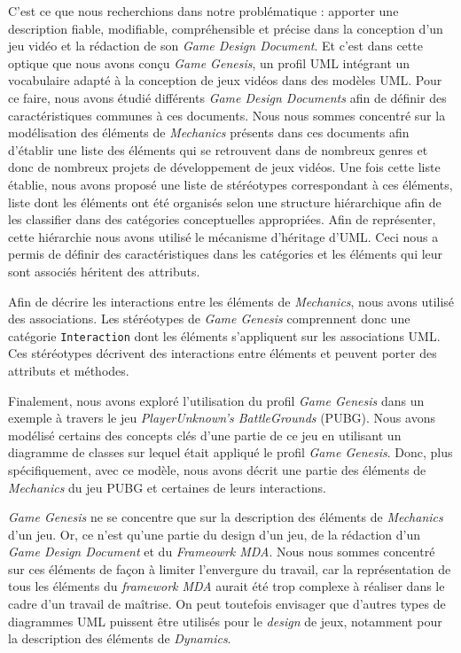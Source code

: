\begin{conclusion}



C'est ce que nous recherchions dans notre problématique : apporter une description fiable, modifiable, compréhensible et précise dans la conception d'un jeu vidéo et la rédaction de son \emph{Game Design Document}.
%
Et c'est dans cette optique que nous avons conçu \emph{Game Genesis}, un profil UML intégrant un vocabulaire adapté à la conception de jeux vidéos dans des modèles UML.
%
Pour ce faire, 
nous avons étudié différents \emph{Game Design Documents} afin de définir des caractéristiques communes à ces documents.
Nous nous sommes concentré sur la modélisation des éléments de \emph{Mechanics} présents dans ces documents afin d'établir une liste des éléments qui se retrouvent dans de nombreux genres et donc de nombreux projets de développement de jeux vidéos.
Une fois cette liste établie, nous avons proposé une liste de stéréotypes correspondant à ces éléments, 
liste dont les éléments ont été organisés selon une structure hiérarchique afin de les classifier dans des catégories conceptuelles appropriées.
Afin de représenter, cette hiérarchie nous avons utilisé le mécanisme d'héritage d'UML.
Ceci nous a permis de définir des caractéristiques dans les catégories et les éléments qui leur sont associés héritent des attributs.

Afin de décrire les interactions entre les éléments de \emph{Mechanics}, nous avons utilisé des associations.
Les stéréotypes de \emph{Game Genesis} comprennent donc une catégorie \texttt{Interaction} dont les éléments s'appliquent sur les associations UML.
Ces stéréotypes décrivent des interactions entre éléments et peuvent porter des attributs et méthodes.

Finalement, nous avons exploré l'utilisation du profil \emph{Game Genesis} dans un exemple à travers le jeu \emph{PlayerUnknown's BattleGrounds} (PUBG).
Nous avons modélisé certains des concepts clés d'une partie de ce jeu en utilisant un diagramme de classes sur lequel était appliqué le profil \emph{Game Genesis}.
Donc, plus spécifiquement, avec ce modèle, nous avons décrit une partie des éléments de \emph{Mechanics} du jeu PUBG et certaines de leurs interactions.

\emph{Game Genesis} ne se concentre que sur la description des éléments de \emph{Mechanics} d'un jeu.
Or, ce n'est qu'une partie du design d'un jeu, de la rédaction d'un \emph{Game Design Document} et du \emph{Frameowrk MDA}.
Nous nous sommes concentré sur ces éléments de façon à limiter l'envergure du travail, car la représentation de tous les éléments du \emph{framework MDA} aurait été trop complexe à réaliser dans le cadre d'un travail de maîtrise.
%
On peut toutefois envisager que d'autres types de diagrammes UML
puissent être utilisés pour le \emph{design} de jeux, notamment
pour la description des éléments de \emph{Dynamics}.


\end{conclusion}
